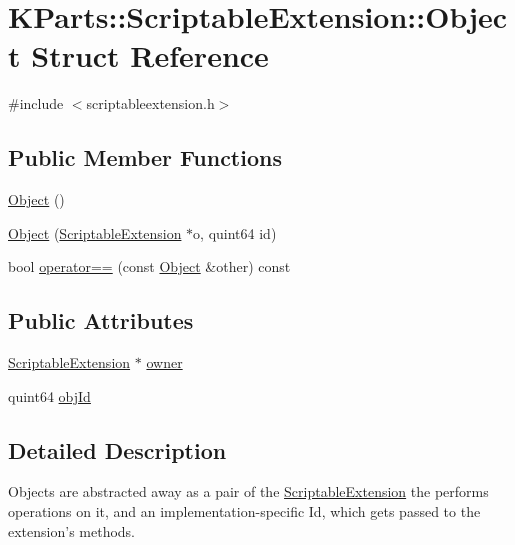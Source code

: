 \hypertarget{structKParts_1_1ScriptableExtension_1_1Object}{\section{\-K\-Parts\-:\-:\-Scriptable\-Extension\-:\-:\-Object \-Struct \-Reference}
\label{structKParts_1_1ScriptableExtension_1_1Object}
}


{\ttfamily \#include $<$scriptableextension.\-h$>$}

\subsection*{\-Public \-Member \-Functions}
\begin{DoxyCompactItemize}
\item 
\hyperlink{structKParts_1_1ScriptableExtension_1_1Object_ac328d8854e2e0ceec2b83544ed34e549}{\-Object} ()
\item 
\hyperlink{structKParts_1_1ScriptableExtension_1_1Object_a322cdc635a708b3e19fe61d576c3c865}{\-Object} (\hyperlink{classKParts_1_1ScriptableExtension}{\-Scriptable\-Extension} $\ast$o, quint64 id)
\item 
bool \hyperlink{structKParts_1_1ScriptableExtension_1_1Object_a9b11da1473dc4d6bedd85334b3c8f44b}{operator==} (const \hyperlink{structKParts_1_1ScriptableExtension_1_1Object}{\-Object} \&other) const 
\end{DoxyCompactItemize}
\subsection*{\-Public \-Attributes}
\begin{DoxyCompactItemize}
\item 
\hyperlink{classKParts_1_1ScriptableExtension}{\-Scriptable\-Extension} $\ast$ \hyperlink{structKParts_1_1ScriptableExtension_1_1Object_a2e2ad2aca3cec31e49e8393658a6997c}{owner}
\item 
quint64 \hyperlink{structKParts_1_1ScriptableExtension_1_1Object_a884270fd3423ea40ec2920cb15c9bd15}{obj\-Id}
\end{DoxyCompactItemize}


\subsection{\-Detailed \-Description}
\-Objects are abstracted away as a pair of the \hyperlink{classKParts_1_1ScriptableExtension}{\-Scriptable\-Extension} the performs operations on it, and an implementation-\/specific \-Id, which gets passed to the extension's methods.

